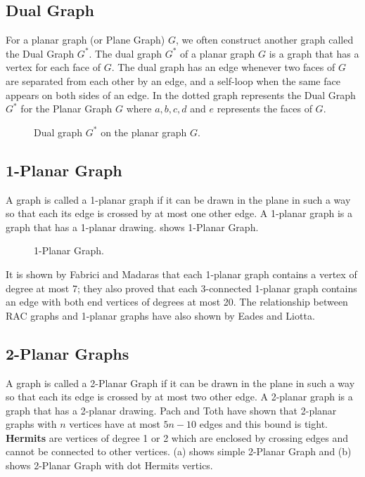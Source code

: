 \subsection{Dual Graph}
For a planar graph (or Plane Graph) $G$, we often construct another graph 
called the Dual Graph $G^{*}$. The dual graph $G^{*}$ of a planar graph $G$ is a graph that has a vertex for each face of $G$. The dual graph has an edge whenever two faces of $G$ are separated from each other by an edge, and a self-loop when the same face appears on both sides of an edge. In  the dotted graph represents the Dual Graph $G^{*}$ for the Planar Graph $G$ where $a,b,c,d$ and $e$ represents the faces of $G$.

\begin{figure}[!tb]
  \centering
\resizebox{70mm}{!}{}
\caption{Dual graph $G^{*}$ on the planar graph $G$.}
\label{fig:dual_graph}
\end{figure}



\subsection{1-Planar Graph}

A graph is called a 1-planar graph if it can be drawn in the plane in such a way so that each its edge is crossed by at most one other edge. A 1-planar graph is a graph that has a 1-planar drawing.  shows 1-Planar Graph.
\\


\begin{figure}[!tb]
 \centering
\resizebox{50mm}{!}{}
\caption{1-Planar Graph.}
\label{fig:1p}
\end{figure}


It is shown by Fabrici and Madaras  \cite{madaras} that each 1-planar graph contains a vertex of degree at most 7; they also proved that each 3-connected 1-planar graph contains an edge with both end vertices of degrees at most 20. The relationship between RAC graphs and 1-planar graphs \cite{p} have also shown by Eades and Liotta.



\subsection{2-Planar Graphs}

A graph is called a 2-Planar Graph if it can be drawn in the plane in such a way so that each its edge is crossed by at most two other edge. A 2-planar graph is a graph that has a 2-planar drawing.
Pach and Toth have shown that 2-planar graphs with $n$ vertices have at most $5n-10$ edges and this bound is tight.
\\
\textbf{Hermits} are vertices of degree 1 or 2 which are enclosed by crossing edges and cannot be connected to other vertices.  (a) shows simple 2-Planar Graph and (b) shows 2-Planar Graph with dot Hermits vertics.


